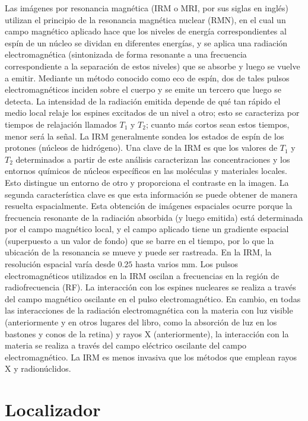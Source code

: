 \documentclass[12pt,a4paper]{book}
\begin{document}
Las imágenes por resonancia magnética (IRM o MRI, por sus siglas en inglés) utilizan el principio de la resonancia magnética nuclear (RMN), en el cual un campo magnético aplicado hace que los niveles de energía correspondientes al espín de un núcleo se dividan en diferentes energías, y se aplica una radiación electromagnética (sintonizada de forma resonante a una frecuencia correspondiente a la separación de estos niveles) que se absorbe y luego se vuelve a emitir. Mediante un método conocido como eco de espín, dos de tales pulsos electromagnéticos inciden sobre el cuerpo y se emite un tercero que luego se detecta. La intensidad de la radiación emitida depende de qué tan rápido el medio local relaje los espines excitados de un nivel a otro; esto se caracteriza por tiempos de relajación llamados $T_1$ y $T_2$; cuanto más cortos sean estos tiempos, menor será la señal. La IRM generalmente sondea los estados de espín de los protones (núcleos de hidrógeno). Una clave de la IRM es que los valores de $T_1$ y $T_2$ determinados a partir de este análisis caracterizan las concentraciones y los entornos químicos de núcleos específicos en las moléculas y materiales locales. Esto distingue un entorno de otro y proporciona el contraste en la imagen. La segunda característica clave es que esta información se puede obtener de manera resuelta espacialmente. Esta obtención de imágenes espaciales ocurre porque la frecuencia resonante de la radiación absorbida (y luego emitida) está determinada por el campo magnético local, y el campo aplicado tiene un gradiente espacial (superpuesto a un valor de fondo) que se barre en el tiempo, por lo que la ubicación de la resonancia se mueve y puede ser rastreada. En la IRM, la resolución espacial varía desde $0.25$ hasta varios $\text{mm}$. Los pulsos electromagnéticos utilizados en la IRM oscilan a frecuencias en la región de radiofrecuencia (RF). La interacción con los espines nucleares se realiza a través del campo magnético oscilante en el pulso electromagnético. En cambio, en todas las interacciones de la radiación electromagnética con la materia con luz visible (anteriormente y en otros lugares del libro, como la absorción de luz en los bastones y conos de la retina) y rayos X (anteriormente), la interacción con la materia se realiza a través del campo eléctrico oscilante del campo electromagnético. La IRM es menos invasiva que los métodos que emplean rayos X y radionúclidos.

\section{Localizador}\label{sec:H2}
\end{document}
